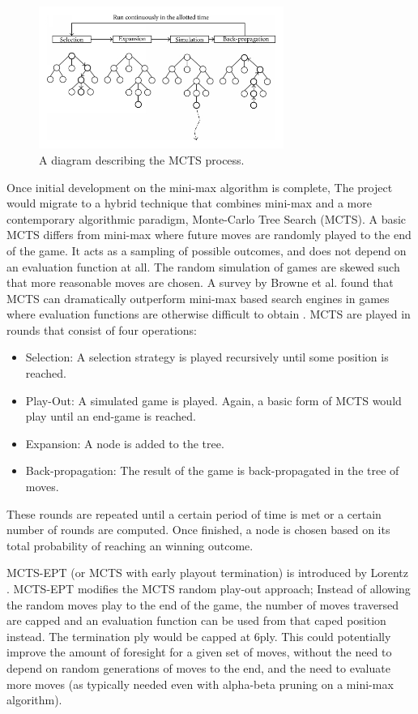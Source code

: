 \documentclass[12pt,a4paper]{article}
\begin{document}
        \begin{figure}[!h]
            \centering
            \includegraphics[width=80mm]{montecarlo.png}
            \caption{A diagram describing the MCTS process.}
        \end{figure}

        Once initial development on the mini-max algorithm is complete, The project would migrate to a hybrid technique that combines mini-max and a more contemporary algorithmic paradigm, Monte-Carlo Tree Search (MCTS). A basic MCTS differs from mini-max where future moves are randomly played to the end of the game. It acts as a sampling of possible outcomes, and does not depend on an evaluation function at all. The random simulation of games are skewed such that more reasonable moves are chosen. A survey by Browne et al. found that MCTS can dramatically outperform mini-max based search engines in games where evaluation functions are otherwise difficult to obtain \cite{browne_survey_2012}. MCTS are played in rounds that consist of four operations:

        \begin{itemize}
            \item Selection: A selection strategy is played recursively until some position is reached. 
            \item Play-Out: A simulated game is played. Again, a basic form of MCTS would play until an end-game is reached.
            \item Expansion: A node is added to the tree.
            \item Back-propagation: The result of the game is back-propagated in the tree of moves.
        \end{itemize}

        These rounds are repeated until a certain period of time is met or a certain number of rounds are computed. Once finished, a node is chosen based on its total probability of reaching an winning outcome.

        MCTS-EPT (or MCTS with early playout termination) is introduced by Lorentz \cite{lorentz_using_2016}. MCTS-EPT modifies the MCTS random play-out approach; Instead of allowing the random moves play to the end of the game, the number of moves traversed are capped and an evaluation function can be used from that caped position instead. The termination ply would be capped at 6ply. This could potentially improve the amount of foresight for a given set of moves, without the need to depend on random generations of moves to the end, and the need to evaluate more moves (as typically needed even with alpha-beta pruning on a mini-max algorithm).
\end{document}
